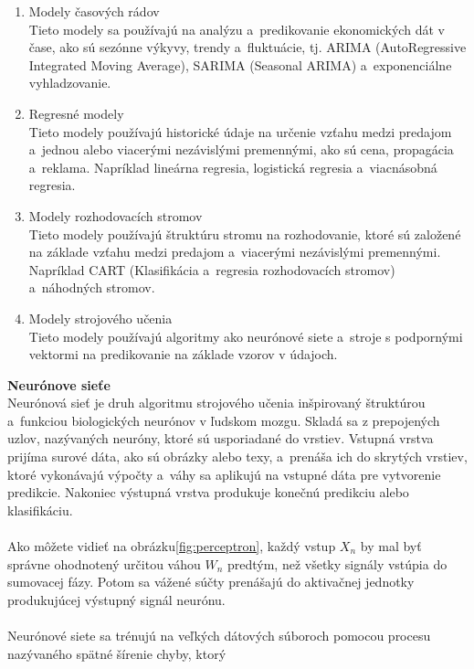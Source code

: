     \begin{enumerate}
        \item Modely časových rádov
        \\Tieto modely sa používajú na analýzu a~predikovanie ekonomických dát v čase,
        ako sú sezónne výkyvy, trendy a~fluktuácie, tj. ARIMA (AutoRegressive Integrated Moving Average),
        SARIMA (Seasonal ARIMA) a~exponenciálne vyhladzovanie.
        \item Regresné modely\\
        Tieto modely používajú historické údaje na určenie vzťahu medzi predajom a~jednou alebo
        viacerými nezávislými premennými, ako sú cena, propagácia a~reklama. Napríklad lineárna regresia,
        logistická regresia a~viacnásobná regresia.
        \item Modely rozhodovacích stromov\\
        Tieto modely používajú štruktúru stromu na rozhodovanie, ktoré sú založené na  základe vzťahu medzi
        predajom a~viacerými nezávislými premennými. Napríklad CART (Klasifikácia a~regresia rozhodovacích
        stromov) a~náhodných stromov.
        \item Modely strojového učenia\\
        Tieto modely používajú algoritmy ako neurónové siete a~stroje s podpornými vektormi na predikovanie
        na základe vzorov v údajoch.
    \end{enumerate}
    \textbf{Neurónove sieťe} \\
    Neurónová sieť je druh algoritmu strojového učenia inšpirovaný štruktúrou\\a~funkciou biologických neurónov v
    ľudskom mozgu. Skladá sa z prepojených uzlov, nazývaných neuróny, ktoré sú usporiadané do vrstiev. Vstupná vrstva
    prijíma surové dáta, ako sú obrázky alebo texy, a~prenáša ich do skrytých vrstiev, ktoré vykonávajú výpočty a~váhy
    sa aplikujú na vstupné dáta pre vytvorenie predikcie. Nakoniec výstupná vrstva produkuje konečnú predikciu
    alebo klasifikáciu.\\
    \\
    Ako môžete vidieť na obrázku\ref{fig:perceptron}, každý vstup $X_n$ by mal byť správne ohodnotený určitou
    váhou $W_n$ predtým, než všetky signály vstúpia do sumovacej fázy. Potom sa vážené súčty prenášajú do aktivačnej
    jednotky produkujúcej výstupný signál neurónu.\\
    \\
    Neurónové siete sa trénujú na veľkých dátových súboroch pomocou procesu nazývaného spätné šírenie chyby, ktorý
